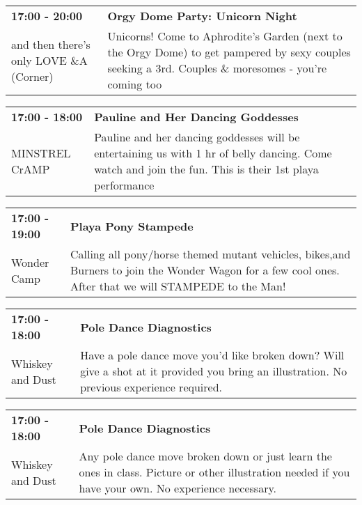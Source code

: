 \begin{tabular}{ p{1in} p{2.2in} }
    \textbf{17:00 - 20:00} & \textbf{Orgy Dome Party: Unicorn Night} \\
    and then there's only LOVE \newline 4\&A (Corner) & Unicorns! Come to Aphrodite's Garden (next to the Orgy Dome) to get pampered by sexy couples seeking a 3rd. Couples \& moresomes - you're coming too \\
    \hline 
\end{tabular}
    
\begin{tabular}{ p{1in} p{2.2in} }
    \textbf{17:00 - 18:00} & \textbf{Pauline and Her Dancing Goddesses} \\
    MINSTREL CrAMP \newline  & Pauline and her dancing goddesses will be entertaining us with 1 hr of belly dancing. Come watch and join the fun. This is their 1st playa performance \\
    \hline 
\end{tabular}
    
\begin{tabular}{ p{1in} p{2.2in} }
    \textbf{17:00 - 19:00} & \textbf{Playa Pony Stampede} \\
    Wonder Camp \newline  & Calling all pony/horse themed mutant vehicles, bikes,and Burners to join the Wonder Wagon for a few cool ones. After that we will STAMPEDE to the Man! \\
    \hline 
\end{tabular}
    
\begin{tabular}{ p{1in} p{2.2in} }
    \textbf{17:00 - 18:00} & \textbf{Pole Dance Diagnostics} \\
    Whiskey and Dust \newline  & Have a pole dance move you'd like broken down? Will give a shot at it provided you bring an illustration. No previous experience required. \\
    \hline 
\end{tabular}
    
\begin{tabular}{ p{1in} p{2.2in} }
    \textbf{17:00 - 18:00} & \textbf{Pole Dance Diagnostics} \\
    Whiskey and Dust \newline  & Any pole dance move broken down or just learn the ones in class. Picture or other illustration needed if you have your own. No experience necessary. \\
    \hline 
\end{tabular}
    
